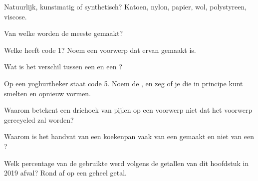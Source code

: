 \begin{exercise}[$\star$]\label{exo:g8:plastics:1}
Natuurlijk, kunstmatig of synthetisch? Katoen, nylon, papier, wol,
polystyreen, viscose.
\end{exercise}

\begin{exercise}[$\star$]\label{exo:g8:plastics:2}
Van welke  worden de meeste  gemaakt?
\end{exercise}

\begin{exercise}[$\star$]\label{exo:g8:plastics:3}
Welke  heeft code 1? Noem een voorwerp dat ervan gemaakt is.
\end{exercise}

\begin{exercise}[$\star$]\label{exo:g8:plastics:4}
Wat is het verschil tussen een  en een ?
\end{exercise}

\begin{exercise}[$\star\star$]\label{exo:g8:plastics:5}
Op een yoghurtbeker staat code 5. Noem de , en zeg of je die in
principe kunt smelten en opnieuw vormen.
\end{exercise}

\begin{exercise}[$\star\star$]\label{exo:g8:plastics:6}
Waarom betekent een driehoek van pijlen op een voorwerp niet dat het
voorwerp gerecycled zal worden?
\end{exercise}

\begin{exercise}[$\star\star$]\label{exo:g8:plastics:7}
Waarom is het handvat van een koekenpan vaak van een 
gemaakt en niet van een ?
\end{exercise}

\begin{exercise}[$\star\star$]\label{exo:g8:plastics:8}
Welk percentage van de gebruikte  werd volgens de getallen van
dit hoofdstuk in 2019 afval? Rond af op een geheel getal.
\end{exercise}

